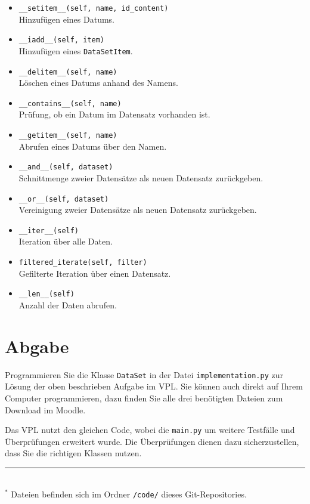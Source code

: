 \documentclass[
    11pt,     
    a4paper,     
    parskip=full
]{article}
\begin{document}
            
            \begin{itemize}
                \item \texttt{\_\_setitem\_\_(self, name, id\_content)} 
                \\ Hinzufügen eines Datums.
                \item \texttt{\_\_iadd\_\_(self, item)} 
                \\ Hinzufügen eines \texttt{Data\-Set\-Item}.
                \item \texttt{\_\_delitem\_\_(self, name)} 
                \\ Löschen eines Datums anhand des Namens.
                \item \texttt{\_\_contains\_\_(self, name)} 
                \\ Prüfung, ob ein Datum im Datensatz vorhanden ist.
                \item \texttt{\_\_getitem\_\_(self, name)} 
                \\ Abrufen eines Datums über den Namen.
                \item \texttt{\_\_and\_\_(self, dataset)} 
                \\ Schnittmenge zweier Datensätze als neuen Datensatz zurückgeben.
                \item \texttt{\_\_or\_\_(self, dataset)} 
                \\ Vereinigung zweier Datensätze als neuen Datensatz zurückgeben.
                \item \texttt{\_\_iter\_\_(self)} 
                \\ Iteration über alle Daten.
                \item \texttt{filtered\_iterate(self, filter)} 
                \\ Gefilterte Iteration über einen Datensatz.
                \item \texttt{\_\_len\_\_(self)} 
                \\ Anzahl der Daten abrufen.
            \end{itemize}
    
    \section{Abgabe}
        Programmieren Sie die Klasse \texttt{Data\-Set} in der Datei \texttt{implementation.py} zur Lösung der oben beschrieben Aufgabe im VPL.
        Sie können auch direkt auf Ihrem Computer programmieren, dazu finden Sie alle drei benötigten Dateien zum Download im Moodle.
        
        Das VPL nutzt den gleichen Code, wobei die \texttt{main.py} um weitere Testfälle und Überprüfungen erweitert wurde. 
        Die Überprüfungen dienen dazu sicherzustellen, dass Sie die richtigen Klassen nutzen.
        \\
        \hrule\hfill\\[0.1cm]
        $^*$ Dateien befinden sich im Ordner \texttt{/code/} dieses Git-Repositories.
\end{document}
